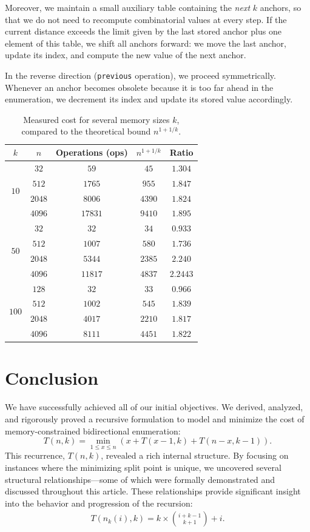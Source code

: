 \documentclass[a4paper,10pt]{article}
\begin{document}
\medskip

Moreover, we maintain a small auxiliary table containing the \emph{next} $k$ anchors, so that we do not need to recompute combinatorial values at every step.  
If the current distance exceeds the limit given by the last stored anchor plus one element of this table, we shift all anchors forward: we move the last anchor, update its index, and compute the new value of the next anchor.

In the reverse direction (\texttt{previous} operation), we proceed symmetrically.  
Whenever an anchor becomes obsolete because it is too far ahead in the enumeration, we decrement its index and update its stored value accordingly.

\begin{table}[H]
\centering
\caption{Measured cost for several memory sizes $k$, compared to the theoretical bound $n^{1+1/k}$.}
\label{tab:k10-50-100}
\medskip
\begin{tabular}{c|c|c|c|c}
\toprule
$k$ & $n$ & Operations (ops) & $n^{1+1/k}$ & Ratio \\
\midrule
\multirow{4}{*}{$10$}
 & $32$   & $59$   & $45$   & $1.304$ \\
 & $512$  & $1765$  & $955$  & $1.847$ \\
 & $2048$  & $8006$  & $4390$  & $1.824$ \\
 & $4096$ & $17831$ & $9410$ & $1.895$ \\
\midrule
\multirow{4}{*}{$50$}
 & $32$   & $32$   & $34$   & $0.933$ \\
 & $512$  & $1007$  & $580$  & $1.736$ \\
 & $2048$  & $5344$  & $2385$  & $2.240$ \\
 & $4096$ & $11817$ & $4837$ & $2.2443$ \\
\midrule
\multirow{4}{*}{$100$}
 & $128$   & $32$   & $33$   & $0.966$ \\
 & $512$  & $1002$  & $545$  & $1.839$ \\
 & $2048$  & $4017$  & $2210$  & $1.817$ \\
 & $4096$ & $8111$ & $4451$ & $1.822$ \\
\bottomrule
\end{tabular}
\end{table}


\section*{Conclusion}
We have successfully achieved all of our initial objectives. We derived, analyzed, and rigorously proved a recursive formulation to model and minimize the cost of memory-constrained bidirectional enumeration:
\[
T(n, k) = \min_{1 \le x \le n} \left( x + T(x - 1, k) + T(n - x, k - 1) \right).
\]
This recurrence, $T(n, k)$, revealed a rich internal structure. By focusing on instances where the minimizing split point is unique, we uncovered several structural relationships—some of which were formally demonstrated and discussed throughout this article. These relationships provide significant insight into the behavior and progression of the recursion:
\begin{align*}
T(n_k(i), k) = k\times \binom{i + k - 1}{k+1} + i.
\end{align*}
\end{document}
